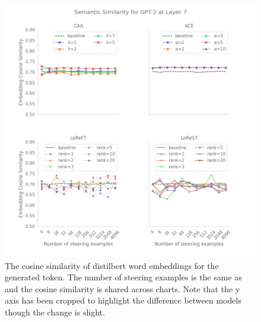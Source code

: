 \begin{figure}
    \centering
    \captionsetup{width=.9\textwidth}
    \includegraphics[width=\textwidth]{figures/gpt2_7_similarity.png}
    \caption{
        The cosine similarity of distilbert \citep{distilbert} word embeddings for the generated token.
        The number of steering examples is the same as  and the cosine similarity is shared across charts.
        Note that the y axis has been cropped to highlight the difference between models though the change is slight.
    }
    \label{fig:gpt-pp-sim}
\end{figure}

